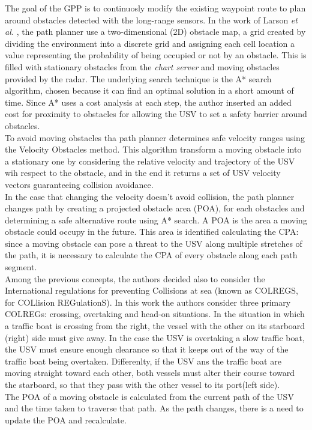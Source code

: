 \documentclass[journal]{IEEEtran}
\begin{document}
              The goal of the GPP is to continuosly modify the existing waypoint route to plan around obstacles detected with the long-range sensors. In the work of Larson \textit{et al.} \cite{Larson2007,Larson2007a}, the path planner use a two-dimensional (2D) obstacle map, a grid created by dividing the environment into a discrete grid and assigning each cell location a value representing the probability of being occupied or not by an obstacle. This is filled with stationary obstacles from the \textit{chart server} and moving obstacles provided by the radar. The underlying search technique is the A* search algorithm, chosen because it can find an optimal solution in a short amount of time. Since A* uses a cost analysis at each step, the author inserted an added cost for proximity to obstacles for allowing the USV to set a safety barrier around obstacles.\\
              To avoid moving obstacles tha path planner determines safe velocity ranges using the Velocity Obstacles method. This algorithm transform a moving obstacle into a stationary one by considering the relative velocity and trajectory of the USV wih respect to the obstacle, and in the end it returns a set of USV velocity vectors guaranteeing collision avoidance.\\
              In the case that changing the velocity doesn't avoid collision, the path planner changes path by creating a projected obstacle area (POA), for each obstacles and determining a safe alternative route using A* search. A POA is the area a moving obstacle could occupy in the future. This area is identified calculating the CPA: since a moving obstacle can pose a threat to the USV along multiple stretches of the path, it is necessary to calculate the CPA of every obstacle along each path segment.\\
              Among the previous concepts, the authors decided also to consider the International regulations for preventing Collisions at sea (known as COLREGS, for COLlision REGulationS). In this work the authors consider three primary COLREGs: crossing, overtaking and head-on situations. In the situation in which a traffic boat is crossing from the right, the vessel with the other on its starboard (right) side must give away. In the case the USV is overtaking a slow traffic boat, the USV must ensure enough clearance so that it keeps out of the way of the traffic boat being overtaken. Differenlty, if the USV ans the traffic boat are moving straight toward each other, both vessels must alter their course toward the starboard, so that they pass with the other vessel to its port(left side).\\
              The POA of a moving obstacle is calculated from the current path of the USV and the time taken to traverse that path. As the path changes, there is a need to update the POA and recalculate.\\
\end{document}
